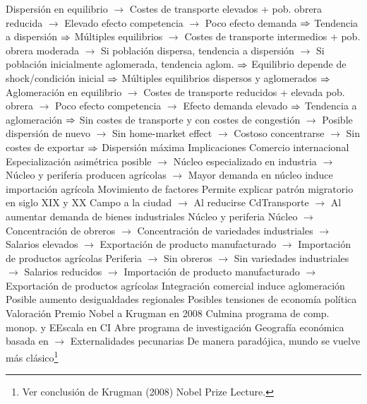 \documentclass{nuevotema}
\begin{document}
\begin{esquemal}
				\4[] Dispersión en equilibrio
				\4[] $\to$ Costes de transporte elevados +  pob. obrera reducida
				\4[] $\to$ Elevado efecto competencia
				\4[] $\to$ Poco efecto demanda
				\4[] $\Rightarrow$ Tendencia a dispersión
				\4[] $\Rightarrow$ 
				\4[] Múltiples equilibrios
				\4[] $\to$ Costes de transporte intermedios + pob. obrera moderada
				\4[] $\to$ Si población dispersa, tendencia a dispersión
				\4[] $\to$ Si población inicialmente aglomerada, tendencia aglom.
				\4[] $\Rightarrow$ Equilibrio depende de shock/condición inicial
				\4[] $\Rightarrow$ Múltiples equilibrios dispersos y aglomerados
				\4[] $\Rightarrow$ 
				\4[] Aglomeración en equilibrio
				\4[] $\to$ Costes de transporte reducidos + elevada pob. obrera
				\4[] $\to$ Poco efecto competencia
				\4[] $\to$ Efecto demanda elevado
				\4[] $\Rightarrow$ Tendencia a aglomeración
				\4[] $\Rightarrow$ 
				\4[] Sin costes de transporte y con costes de congestión
				\4[] $\to$ Posible dispersión de nuevo
				\4[] $\to$ Sin home-market effect
				\4[] $\to$ Costoso concentrarse
				\4[] $\to$ Sin costes de exportar
				\4[] $\Rightarrow$ Dispersión máxima
			\3 Implicaciones
				\4 Comercio internacional
				\4[] Especialización asimétrica posible
				\4[] $\to$ Núcleo especializado en industria
				\4[] $\to$ Núcleo y periferia producen agrícolas
				\4[] $\to$ Mayor demanda en núcleo induce importación agrícola
				\4 Movimiento de factores
				\4[] Permite explicar patrón migratorio en siglo XIX y XX
				\4[] Campo a la ciudad
				\4[] $\to$ Al reducirse CdTransporte
				\4[] $\to$ Al aumentar demanda de bienes industriales
				\4 Núcleo y periferia
				\4[] Núcleo
				\4[] $\to$ Concentración de obreros
				\4[] $\to$ Concentración de variedades industriales
				\4[] $\to$ Salarios elevados
				\4[] $\to$ Exportación de producto manufacturado
				\4[] $\to$ Importación de productos agrícolas
				\4[] Periferia
				\4[] $\to$ Sin obreros
				\4[] $\to$ Sin variedades industriales
				\4[] $\to$ Salarios reducidos
				\4[] $\to$ Importación de producto manufacturado
				\4[] $\to$ Exportación de productos agrícolas
				\4 Integración comercial induce aglomeración
				\4[] Posible aumento desigualdades regionales
				\4[] Posibles tensiones de economía política
			\3 Valoración
				\4 Premio Nobel a Krugman en 2008
				\4[] Culmina programa de comp. monop. y EEscala en CI
				\4 Abre programa de investigación
				\4[] Geografía económica basada en
				\4[] $\to$ Externalidades pecunarias
				\4 De manera paradójica, mundo se vuelve más clásico\footnote{Ver conclusión de Krugman (2008) Nobel Prize Lecture.}

\end{esquemal}
\end{document}
